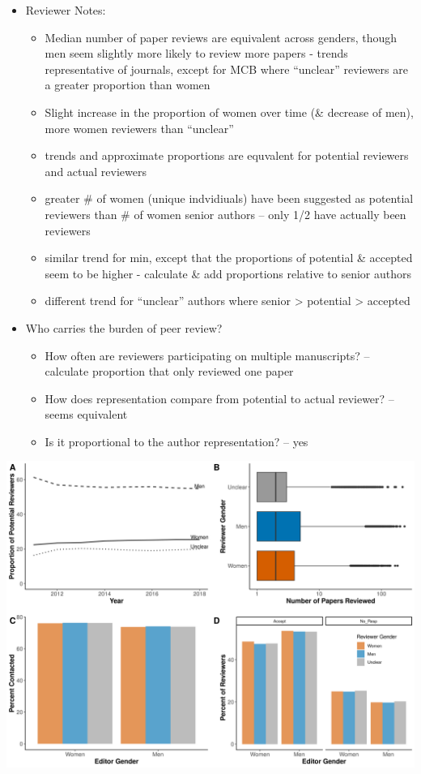 \documentclass[11pt,]{article}
\providecommand{\tightlist}{%
  \setlength{\itemsep}{0pt}\setlength{\parskip}{0pt}}
\begin{document}
\begin{itemize}
\tightlist
\item
  Reviewer Notes:

  \begin{itemize}
  \tightlist
  \item
    Median number of paper reviews are equivalent across genders, though
    men seem slightly more likely to review more papers - trends
    representative of journals, except for MCB where ``unclear''
    reviewers are a greater proportion than women
  \item
    Slight increase in the proportion of women over time (\& decrease of
    men), more women reviewers than ``unclear''
  \item
    trends and approximate proportions are equvalent for potential
    reviewers and actual reviewers
  \item
    greater \# of women (unique indvidiuals) have been suggested as
    potential reviewers than \# of women senior authors -- only 1/2 have
    actually been reviewers
  \item
    similar trend for min, except that the proportions of potential \&
    accepted seem to be higher - calculate \& add proportions relative
    to senior authors
  \item
    different trend for ``unclear'' authors where senior \textgreater{}
    potential \textgreater{} accepted
  \end{itemize}
\item
  Who carries the burden of peer review?

  \begin{itemize}
  \tightlist
  \item
    How often are reviewers participating on multiple manuscripts? --
    calculate proportion that only reviewed one paper
  \item
    How does representation compare from potential to actual reviewer?
    -- seems equivalent
  \item
    Is it proportional to the author representation? -- yes
  \end{itemize}
\end{itemize}

\includegraphics{Figure_2.png}
\end{document}
